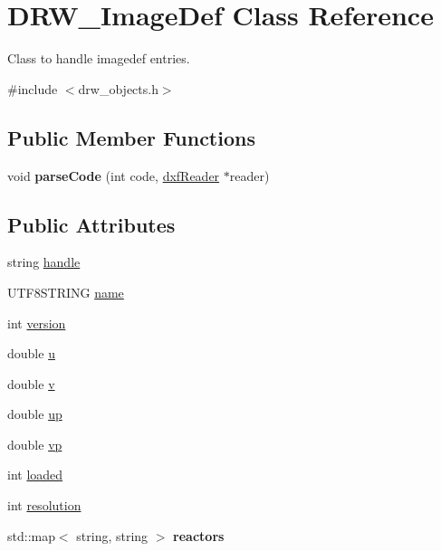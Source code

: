 \hypertarget{classDRW__ImageDef}{\section{D\-R\-W\-\_\-\-Image\-Def Class Reference}
\label{classDRW__ImageDef}
}


Class to handle imagedef entries.  




{\ttfamily \#include $<$drw\-\_\-objects.\-h$>$}

\subsection*{Public Member Functions}
\begin{DoxyCompactItemize}
\item 
\hypertarget{classDRW__ImageDef_a848d212c260acaf32bd2883292667e4a}{void {\bfseries parse\-Code} (int code, \hyperlink{classdxfReader}{dxf\-Reader} $\ast$reader)}\label{classDRW__ImageDef_a848d212c260acaf32bd2883292667e4a}

\end{DoxyCompactItemize}
\subsection*{Public Attributes}
\begin{DoxyCompactItemize}
\item 
string \hyperlink{classDRW__ImageDef_a55f309b610121bcdb03f131907254cac}{handle}
\item 
U\-T\-F8\-S\-T\-R\-I\-N\-G \hyperlink{classDRW__ImageDef_abd0cb813e416eba0b541beb90ba8a1c4}{name}
\item 
int \hyperlink{classDRW__ImageDef_a2f47b0e3ad2e33f750bbe97d3e30ceaf}{version}
\item 
double \hyperlink{classDRW__ImageDef_afe11ccfebf55c9ec07a92cda8f09d98c}{u}
\item 
double \hyperlink{classDRW__ImageDef_a25c16e07b7d0887cf71f4d276b58217c}{v}
\item 
double \hyperlink{classDRW__ImageDef_ad33a25f477e0448bae9a74fc902efafc}{up}
\item 
double \hyperlink{classDRW__ImageDef_a95e92947b72818845b6cd9fe0c9add8a}{vp}
\item 
int \hyperlink{classDRW__ImageDef_a2265a01592e1b25b1a4c6294423f76f6}{loaded}
\item 
int \hyperlink{classDRW__ImageDef_a4bc6163d679744d2f58c00cb5d6573b0}{resolution}
\item 
\hypertarget{classDRW__ImageDef_a85947ea78b9e0aed7d533f8d93fb29aa}{std\-::map$<$ string, string $>$ {\bfseries reactors}}\label{classDRW__ImageDef_a85947ea78b9e0aed7d533f8d93fb29aa}

\end{DoxyCompactItemize}


